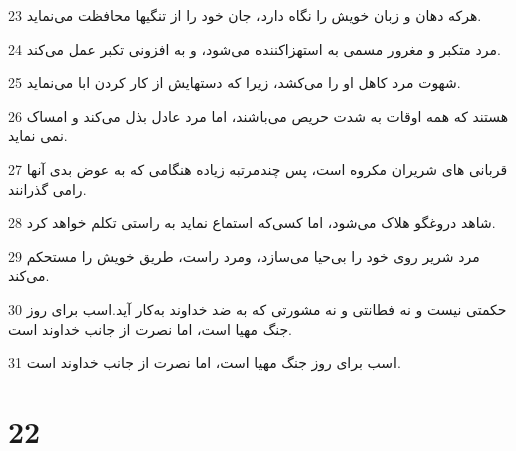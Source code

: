 \par 23 هر‌که دهان و زبان خویش را نگاه دارد، جان خود را از تنگیها محافظت می‌نماید.
\par 24 مرد متکبر و مغرور مسمی به استهزاکننده می‌شود، و به افزونی تکبر عمل می‌کند.
\par 25 شهوت مرد کاهل او را می‌کشد، زیرا که دستهایش از کار کردن ابا می‌نماید.
\par 26 هستند که همه اوقات به شدت حریص می‌باشند، اما مرد عادل بذل می‌کند و امساک نمی نماید. 
\par 27 قربانی های شریران مکروه است، پس چندمرتبه زیاده هنگامی که به عوض بدی آنها رامی گذرانند.
\par 28 شاهد دروغگو هلاک می‌شود، اما کسی‌که استماع نماید به راستی تکلم خواهد کرد.
\par 29 مرد شریر روی خود را بی‌حیا می‌سازد، ومرد راست، طریق خویش را مستحکم می‌کند.
\par 30 حکمتی نیست و نه فطانتی و نه مشورتی که به ضد خداوند به‌کار آید.اسب برای روز جنگ مهیا است، اما نصرت از جانب خداوند است.
\par 31 اسب برای روز جنگ مهیا است، اما نصرت از جانب خداوند است.
 
\chapter{22}

